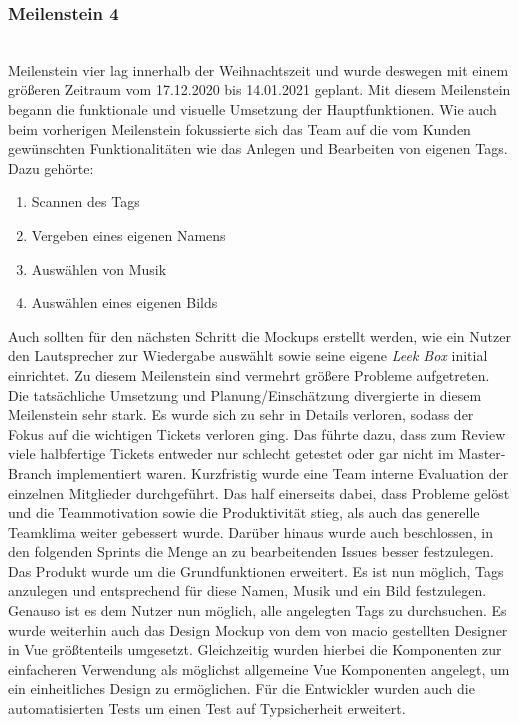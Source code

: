 \documentclass[10pt, a4paper]{article}
\begin{document}
\subsubsection*{Meilenstein 4} $~$ \\
Meilenstein vier lag innerhalb der Weihnachtszeit und wurde deswegen mit einem größeren Zeitraum vom 17.12.2020 bis 14.01.2021 geplant.
Mit diesem Meilenstein begann die funktionale und visuelle Umsetzung der Hauptfunktionen.
Wie auch beim vorherigen Meilenstein fokussierte sich das Team auf die vom Kunden gewünschten Funktionalitäten wie das Anlegen und Bearbeiten von eigenen Tags.
Dazu gehörte:
\begin{enumerate}
  \item Scannen des Tags
  \item Vergeben eines eigenen Namens
  \item Auswählen von Musik
  \item Auswählen eines eigenen Bilds
\end{enumerate}
Auch sollten für den nächsten Schritt die Mockups erstellt werden, wie ein Nutzer den Lautsprecher zur Wiedergabe auswählt sowie seine eigene \textit{Leek Box} initial einrichtet.
Zu diesem Meilenstein sind vermehrt größere Probleme aufgetreten.
Die tatsächliche Umsetzung und Planung/Einschätzung divergierte in diesem Meilenstein sehr stark.
Es wurde sich zu sehr in Details verloren, sodass der Fokus auf die wichtigen Tickets verloren ging.
Das führte dazu, dass zum Review viele halbfertige Tickets entweder nur schlecht getestet oder gar nicht im Master-Branch implementiert waren.
Kurzfristig wurde eine Team interne Evaluation der einzelnen Mitglieder durchgeführt.
Das half einerseits dabei, dass Probleme gelöst und die Teammotivation sowie die Produktivität stieg, als auch das generelle Teamklima weiter gebessert wurde.
Darüber hinaus wurde auch beschlossen, in den folgenden Sprints die Menge an zu bearbeitenden Issues besser festzulegen.
Das Produkt wurde um die Grundfunktionen erweitert.
Es ist nun möglich, Tags anzulegen und entsprechend für diese Namen, Musik und ein Bild festzulegen.
Genauso ist es dem Nutzer nun möglich, alle angelegten Tags zu durchsuchen.
Es wurde weiterhin auch das Design Mockup von dem von macio gestellten Designer in Vue größtenteils umgesetzt.
Gleichzeitig wurden hierbei die Komponenten zur einfacheren Verwendung als möglichst allgemeine Vue Komponenten angelegt, um ein einheitliches Design zu ermöglichen.
Für die Entwickler wurden auch die automatisierten Tests um einen Test auf Typsicherheit erweitert.
\end{document}
